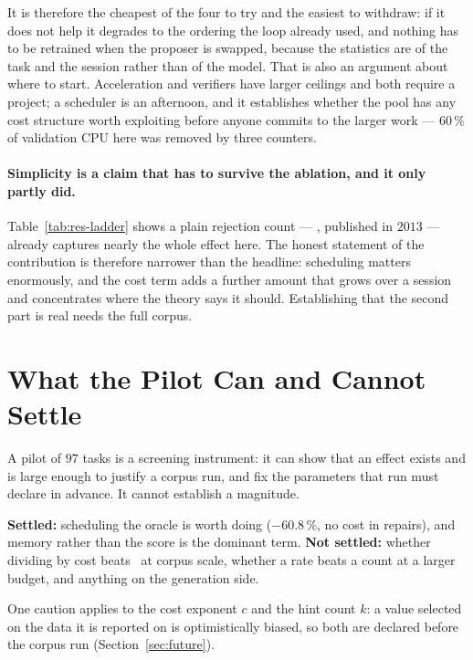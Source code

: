 It is therefore the cheapest of the four to try and the easiest to withdraw:
if it does not help it degrades to the ordering the loop already used, and
nothing has to be retrained when the proposer is swapped, because the
statistics are of the task and the session rather than of the model. That is
also an argument about where to start. Acceleration and verifiers have larger
ceilings and both require a project; a scheduler is an afternoon, and it
establishes whether the pool has any cost structure worth exploiting before
anyone commits to the larger work --- $60\,\%$ of validation CPU here was
removed by three counters.

\paragraph{Simplicity is a claim that has to survive the ablation, and it only
partly did.} Table~\ref{tab:res-ladder} shows a plain rejection count ---
\frtp, published in $2013$ --- already captures nearly the whole effect here.
The honest statement of the contribution is therefore narrower than the
headline: scheduling matters enormously, and the cost term adds a further
amount that grows over a session and concentrates where the theory says it
should. Establishing that the second part is real needs the full corpus.

\section{What the Pilot Can and Cannot Settle}
\label{sec:disc-scope}

A pilot of $97$ tasks is a screening instrument: it can show that an effect
exists and is large enough to justify a corpus run, and fix the parameters
that run must declare in advance. It cannot establish a magnitude.

\textbf{Settled:} scheduling the oracle is worth doing ($-60.8\,\%$, no cost
in repairs), and memory rather than the score is the dominant term.
\textbf{Not settled:} whether dividing by cost beats \frtp\ at corpus scale,
whether a rate beats a count at a larger budget, and anything on the
generation side.

One caution applies to the cost exponent $c$ and the hint count $k$: a value
selected on the data it is reported on is optimistically biased, so both are
declared before the corpus run (Section~\ref{sec:future}).
